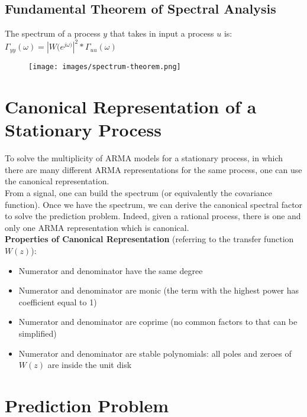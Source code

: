 \documentclass[10pt,a4paper]{article}
\begin{document}
\subsection{Fundamental Theorem of Spectral Analysis}
The spectrum of a process $y$ that takes in input a process $u$ is:
\center 
$\Gamma_{yy}(\omega)=|W(e^{j \omega)}|^2*\Gamma_{uu}(\omega)$
\\
 \begin{figure}[h!]
 \hfill \texttt{[image: images/spectrum-theorem.png]}\hspace*{\fill}
  \label{fig:spectrum-theorem}
\end{figure}
\raggedright
\section{Canonical Representation of a Stationary Process}
To solve the multiplicity of ARMA models for a stationary process, in which there are many different ARMA representations for the same process, one can use the canonical representation. \\
From a signal, one can build the spectrum (or equivalently the covariance function). Once we have the spectrum, we can derive the canonical spectral factor to solve the prediction problem. Indeed, given a rational process, there is one and only one ARMA representation which is canonical. \\
\pagebreak
\textbf{Properties of Canonical Representation} (referring to the transfer function $W(z)$):
\begin{itemize}
	\item Numerator and denominator have the same degree
	\item Numerator and denominator are monic (the term with the highest power has coefficient equal to 1)
	\item Numerator and denominator are coprime (no common factors to that can be simplified)
	\item Numerator and denominator are stable polynomials: all poles and zeroes of $W(z)$ are inside the unit disk
\end{itemize}
\section{Prediction Problem}
\end{document}
